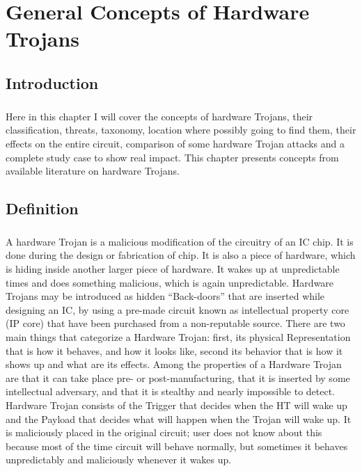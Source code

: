 \chapter{General Concepts of Hardware Trojans}
\section{Introduction}
\paragraph*{}
Here in this chapter I will cover the concepts of hardware Trojans, their classification, threats, taxonomy, location where possibly going to find them, their effects on the entire circuit, comparison of some hardware Trojan attacks and a complete study case to show real impact. This chapter presents concepts from available literature on hardware Trojans.
\section{Definition}
\paragraph*{}
A hardware Trojan is a malicious modification of the circuitry of an IC chip. It is done during the design or fabrication of chip. It is also a piece of hardware, which is hiding inside another larger piece of hardware. It wakes up at unpredictable times and does something malicious, which is again unpredictable. Hardware Trojans may be introduced as hidden “Back-doors” that are inserted while designing an IC, by using a pre-made circuit known as intellectual property core (IP core) that have been purchased from a non-reputable source. There are two main things that categorize a Hardware Trojan: first, its physical Representation that is how it behaves, and how it looks like, second its behavior that is how it shows up and what are its effects. Among the properties of a Hardware Trojan are that it can take place pre- or post-manufacturing, that it is inserted by some intellectual adversary, and that it is stealthy and nearly impossible to detect. Hardware Trojan consists of the Trigger that decides when the HT will wake up and the Payload that decides what will happen when the Trojan will wake up. It is maliciously placed in the original circuit; user does not know about this because most of the time circuit will behave normally, but sometimes it behaves unpredictably and maliciously whenever it wakes up.
